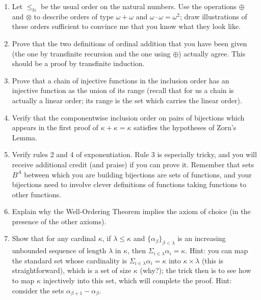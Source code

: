 \documentclass[12pt]{book}
\begin{document}
\begin{enumerate}


\item  Let $\leq_{\mathbb N}$ be the usual order on the natural numbers.  Use the operations $\oplus$ and $\otimes$ to describe
orders of type $\omega+\omega$ and $\omega\cdot \omega = \omega^2$;  draw illustrations of these orders sufficient to convince me that you know what they look like.

\item  Prove that the two definitions of ordinal addition that you have been given (the one by transfinite recursion and the one using $\oplus$) actually agree.  This should be a proof by transfinite induction.

\item  Prove that a chain of injective functions in the inclusion order has an injective function as the union of its range (recall that for us a chain is actually a linear order;  its range is the set which carries the linear order).

\item Verify that the componentwise inclusion order on pairs of bijections which appears in the first proof of $\kappa+\kappa=\kappa$ satisfies the hypotheses of Zorn's Lemma.



\item Verify rules 2 and 4 of exponentiation.  Rule 3 is especially tricky, and you will receive additional credit (and praise) if you can prove it.
Remember that sets $B^A$ between which you are building bijections are sets of functions, and your bijections need to involve clever definitions of functions taking functions to other functions.

\item Explain why the Well-Ordering Theorem implies the axiom of choice (in the presence of the other axioms).

\item  Show that for any cardinal $\kappa$, if $\lambda\leq \kappa$ and $\{\alpha_{\beta}\}_{\beta<\lambda}$ is an increasing unbounded sequence of length $\lambda$ in $\kappa$, then $\Sigma_{i \in \lambda}\alpha_i= \kappa$.  Hint:  you can map the standard set whose cardinality is  $\Sigma_{i \in \lambda}\alpha_i= \kappa$ into $\kappa \times \lambda$ (this is straightforward), which is a set of size $\kappa$ (why?);  the trick then is to see how to map $\kappa$ injectively into this set, which will complete the proof.  Hint:  consider the sets $\alpha_{\beta+1} - \alpha_{\beta}$.


\end{enumerate}
\end{document}
